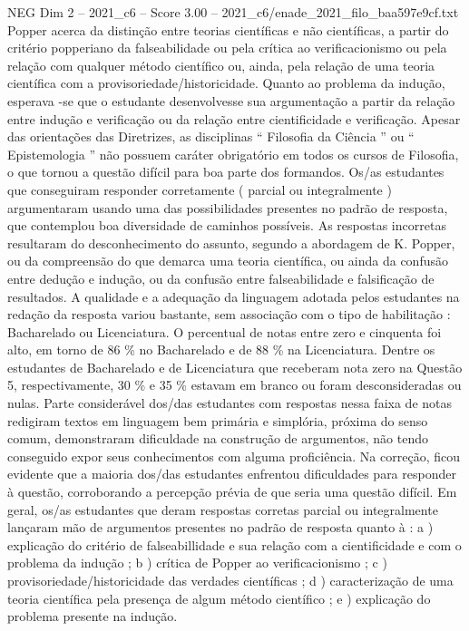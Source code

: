 \begin{textsample}{NEG Dim 2 – 2021\_c6 – Score 3.00 – 2021\_c6/enade\_2021\_filo\_baa597e9cf.txt}
Popper acerca da distinção entre teorias científicas e não científicas, a partir do critério popperiano da falseabilidade ou pela crítica ao verificacionismo ou pela relação com qualquer método científico ou, ainda, pela relação de uma teoria científica com a provisoriedade/historicidade.
Quanto ao problema da indução, esperava -se que o estudante desenvolvesse sua argumentação a partir da relação entre indução e verificação ou da relação entre cientificidade e verificação.
Apesar das orientações das Diretrizes, as disciplinas “ Filosofia da Ciência ” ou “ Epistemologia ” não possuem caráter obrigatório em todos os cursos de Filosofia, o que tornou a questão difícil para boa parte dos formandos.
Os/as estudantes que conseguiram responder corretamente ( parcial ou integralmente ) argumentaram usando uma das possibilidades presentes no padrão de resposta, que contemplou boa diversidade de caminhos possíveis.
As respostas incorretas resultaram do desconhecimento do assunto, segundo a abordagem de K.
Popper, ou da compreensão do que demarca uma teoria científica, ou ainda da confusão entre dedução e indução, ou da confusão entre falseabilidade e falsificação de resultados.
A qualidade e a adequação da linguagem adotada pelos estudantes na redação da resposta variou bastante, sem associação com o tipo de habilitação : Bacharelado ou Licenciatura.
O percentual de notas entre zero e cinquenta foi alto, em torno de 86 \% no Bacharelado e de 88 \% na Licenciatura.
Dentre os estudantes de Bacharelado e de Licenciatura que receberam nota zero na Questão 5, respectivamente, 30 \% e 35 \% estavam em branco ou foram desconsideradas ou nulas.
Parte considerável dos/das estudantes com respostas nessa faixa de notas redigiram textos em linguagem bem primária e simplória, próxima do senso comum, demonstraram dificuldade na construção de argumentos, não tendo conseguido expor seus conhecimentos com alguma proficiência.
Na correção, ficou evidente que a maioria dos/das estudantes enfrentou dificuldades para responder à questão, corroborando a percepção prévia de que seria uma questão difícil.
Em geral, os/as estudantes que deram respostas corretas parcial ou integralmente lançaram mão de argumentos presentes no padrão de resposta quanto à : a ) explicação do critério de falseabillidade e sua relação com a cientificidade e com o problema da indução ; b ) crítica de Popper ao verificacionismo ; c ) provisoriedade/historicidade das verdades científicas ; d ) caracterização de uma teoria científica pela presença de algum método científico ; e ) explicação do problema presente na indução.

\end{textsample}
